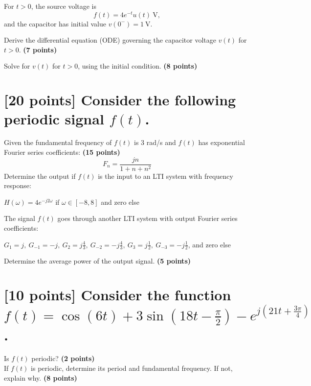 \documentclass[12pt,letterpaper, onecolumn]{exam}
\begin{document}
For \(t > 0\), the source voltage is
\[
f(t) = 4 e^{-t} u(t)\ \text{V},
\]
and the capacitor has initial value \(v(0^-) = 1\ \text{V}\).

\begin{questions}

\question Derive the differential equation (ODE) governing the capacitor voltage \(v(t)\) for \(t > 0\).  
\textbf{(7 points)}  


\question Solve for \(v(t)\) for \(t > 0\), using the initial condition.  
\textbf{(8 points)}  

\end{questions}

\section{[20 points] Consider the following periodic signal $f(t)$.}

\begin{questions}
\question Given the fundamental frequency of $f(t)$ is 3 rad/s and $f(t)$ has exponential Fourier series coefficients: \textbf{(15 points)}
    \[F_n = \frac{jn}{1+n+n^2} \]
Determine the output if $f(t)$ is the input to an LTI system with frequency response:
\begin{center}
    $H(\omega) = 4e^{-j2\omega}$ if $\omega \in [-8,8]$ and zero else
\end{center}

\newpage

\question The signal $f(t)$ goes through another LTI system with output Fourier series coefficients:
\begin{center}
   $G_1 = j,\ G_{-1} = -j,\ G_2 = j\frac{4}{3},\ G_{-2} = -j\frac{4}{3},\ G_3 = j\frac{1}{2},\ G_{-3} = -j\frac{1}{2}$, and zero else
\end{center}
Determine the average power of the output signal. \textbf{(5 points)}

\end{questions}

\section{[10 points] Consider the function $f(t) = \cos{(6t)} + 3\sin{(18t-\frac{\pi}{2})} - e^{j(21t + \frac{3\pi}{4})}$.}

\begin{questions} 
\question Is $f(t)$ periodic? \textbf{(2 points)} \\

\question If $f(t)$ is periodic, determine its period and fundamental frequency. If not, explain why. \textbf{(8 points)}
\end{questions}
\end{document}
